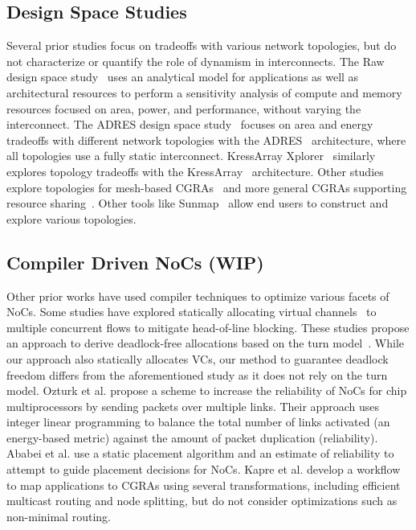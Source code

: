 \subsection{Design Space Studies} Several prior studies focus on tradeoffs with various network topologies, but do not characterize or quantify the role of dynamism in interconnects.
The Raw design space study~\cite{dse-raw} uses an analytical model for applications as well as architectural resources to perform a sensitivity analysis of compute and memory resources focused on area, power, and performance, without varying the interconnect. The ADRES design space study~\cite{dse-adres} focuses on area and energy tradeoffs with different network topologies with the ADRES~\cite{adres} architecture, where all topologies use a fully static interconnect. KressArray Xplorer~\cite{dse-kressarray} similarly explores topology tradeoffs with the KressArray~\cite{kress} architecture. Other studies explore topologies for mesh-based CGRAs~\cite{dse-date} and more general CGRAs supporting resource sharing~\cite{dse-tvlsi}. Other tools like Sunmap~\cite{sunmap} allow end users to construct and explore various topologies.

\subsection{Compiler Driven NoCs (WIP)}
Other prior works have used compiler techniques to optimize various facets of NoCs.
Some studies have explored statically allocating virtual channels~\cite{staticVC-isca, staticVC-nocs} to multiple concurrent flows to mitigate head-of-line blocking. These studies propose an approach to derive deadlock-free allocations based on the turn model~\cite{turnModel}. While our approach also statically allocates VCs, our method to guarantee deadlock freedom differs from the aforementioned study as it does not rely on the turn model.
Ozturk et al. \cite{ozturk2010compiler} propose a scheme to increase the reliability of NoCs for chip multiprocessors by sending packets over multiple links.
Their approach uses integer linear programming to balance the total number of links activated (an energy-based metric) against the amount of packet duplication (reliability).
Ababei et al. \cite{ababei2011energy} use a static placement algorithm and an estimate of reliability to attempt to guide placement decisions for NoCs.
Kapre et al. \cite{kapre2011noc} develop a workflow to map applications to CGRAs using several transformations, including efficient multicast routing and node splitting, but do not consider optimizations such as non-minimal routing.

